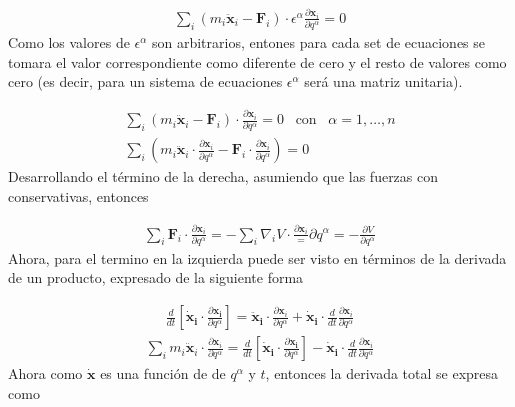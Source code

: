     \begin{gather*}
        \sum_i (m_i\ddot{\mathbf{x}}_i - \mathbf{F}_i) \cdot \epsilon^{\alpha} \frac{\partial \mathbf{x}_i}{\partial q^{\alpha}} = 0
    \end{gather*}
    Como los valores de $\epsilon^{\alpha}$ son arbitrarios, entones para cada set de ecuaciones se tomara el valor correspondiente como diferente de cero y el resto de valores como cero (es decir, para un sistema de ecuaciones $\epsilon^{\alpha}$ será una matriz unitaria).

    \begin{gather*}
        \sum_i (m_i\ddot{\mathbf{x}}_i - \mathbf{F}_i) \cdot  \frac{\partial \mathbf{x}_i}{\partial q^{\alpha}} = 0 \;\;\; \text{con} \;\;\; \alpha = 1, \dots, n\\
        \sum_i \left(m_i\ddot{\mathbf{x}}_i\cdot  \frac{\partial \mathbf{x}_i}{\partial q^{\alpha}} - \mathbf{F}_i \cdot  \frac{\partial \mathbf{x}_i}{\partial q^{\alpha}}\right)  = 0
    \end{gather*}
    Desarrollando el término de la derecha, asumiendo que las fuerzas con conservativas, entonces 

    \begin{gather*}
        \sum_i \mathbf{F}_i \cdot  \frac{\partial \mathbf{x}_i}{\partial q^{\alpha}} =  - \sum_i \nabla_i V\cdot  \frac{\partial \mathbf{x}_i} ={\partial q^{\alpha}} = - \frac{\partial V}{\partial q^{\alpha}}
    \end{gather*}
    Ahora, para el termino en la izquierda puede ser visto en términos de la derivada de un producto, expresado de la siguiente forma

    \begin{gather*}
        \frac{d}{dt}\left[\mathbf{\dot{x}_i} \cdot  \frac{\partial \mathbf{x_i}}{\partial q^{\alpha}}\right] = \mathbf{\ddot{x}_i} \cdot \frac{\partial \mathbf{x}_i}{\partial q^{\alpha}} + \mathbf{\dot{x}_i} \cdot \frac{d}{dt}\frac{\partial \mathbf{x}_i}{\partial q^{\alpha}}
    \end{gather*}
    \begin{gather*}
        \sum_i m_i\ddot{\mathbf{x}}_i\cdot  \frac{\partial \mathbf{x}_i} {\partial q^{\alpha}} = \frac{d}{dt}\left[\mathbf{\dot{x}_i} \cdot  \frac{\partial \mathbf{x_i}}{\partial q^{\alpha}}\right] - \mathbf{\dot{x}_i} \cdot \frac{d}{dt}\frac{\partial \mathbf{x}_i}{\partial q^{\alpha}}
    \end{gather*}
Ahora como $\mathbf{\dot{x}}$ es una función de de $q^{\alpha}$ y $t$, entonces la derivada total se expresa como 

